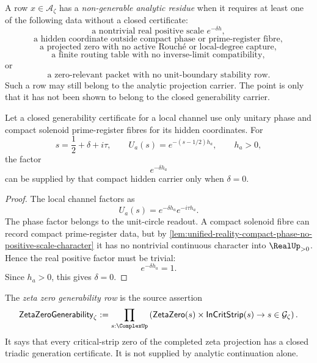 \begin{definition}
\label{def:unified-reality-non-generable-analytic-residue}
A row $x\in\mathcal A_{\zeta}$ has a \emph{non-generable analytic
residue} when it requires at least one of the following data without a
closed certificate:
$$
\text{a nontrivial real positive scale }e^{-\delta h},
$$
$$
\text{a hidden coordinate outside compact phase or prime-register fibre},
$$
$$
\text{a projected zero with no active Rouch\'e or local-degree capture},
$$
$$
\text{a finite routing table with no inverse-limit compatibility},
$$
or
$$
\text{a zero-relevant packet with no unit-boundary stability row}.
$$
Such a row may still belong to the analytic projection carrier.  The
point is only that it has not been shown to belong to the closed
generability carrier.
\end{definition}

\begin{theorem}
\label{thm:unified-reality-real-positive-scale-not-closed-compact-residue}
Let a closed generability certificate for a local channel use only
unitary phase and compact solenoid prime-register fibres for its hidden
coordinates.  For
$$
s=\frac12+\delta+i\tau,
\qquad
U_a(s)=e^{-(s-1/2)h_a},
\qquad
h_a>0,
$$
the factor
$$
e^{-\delta h_a}
$$
can be supplied by that compact hidden carrier only when $\delta=0$.
\end{theorem}

\begin{proof}
The local channel factors as
$$
U_a(s)=e^{-\delta h_a}e^{-i\tau h_a}.
$$
The phase factor belongs to the unit-circle readout.  A compact solenoid
fibre can record compact prime-register data, but by
\autoref{lem:unified-reality-compact-phase-no-positive-scale-character}
it has no nontrivial continuous character into $\RealUp_{>0}$.  Hence the
real positive factor must be trivial:
$$
e^{-\delta h_a}=1.
$$
Since $h_a>0$, this gives $\delta=0$.
\end{proof}

\begin{definition}
\label{def:unified-reality-zeta-zero-generability-row}
The \emph{zeta zero generability row} is the source assertion
$$
\mathsf{ZetaZeroGenerability}_{\zeta}
:=
\prod_{s:\ComplexUp}
\left(
\mathsf{ZetaZero}(s)
\times
\mathsf{InCritStrip}(s)
\to
s\in\mathcal G_{\zeta}
\right).
$$
It says that every critical-strip zero of the completed zeta projection
has a closed triadic generation certificate.  It is not supplied by
analytic continuation alone.
\end{definition}

